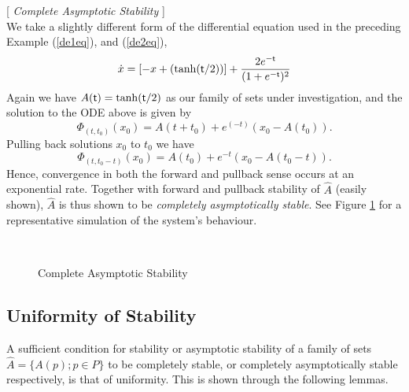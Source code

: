 \begin{eg} \label{caseg} [ {\em Complete Asymptotic Stability} ] \hfill \\
  We take a slightly different form of the differential equation
  used in the preceding Example (\ref{de1eq}), and (\ref{de2eq}),
  \begin{equation}
  \dot{x} = \left[ -x + \left( \tanh( \mathsf{\mathsf{t}}/2) \right) \right]
        + \frac{2e^{- \mathsf{\mathsf{t}}}} {(1 + e^{- \mathsf{\mathsf{t}}})^2}
  \end{equation}
  Again we have $A( \mathsf{\mathsf{t}}) = \tanh( \mathsf{\mathsf{t}}/2)$ as our family of sets under
  investigation, and the solution to the ODE above is given by
  \[ \Phi_{(t,t_0)}(x_0) = A(t + t_0) + e^{(-t)}(x_0 - A(t_0)). \]
  Pulling back solutions $x_0$ to $t_0$ we have
  \[ \Phi_{(t,t_0-t)}(x_0) = A(t_0) + e^{-t}(x_0 - A(t_0-t)). \]
  Hence, convergence in both the forward and pullback sense occurs
  at an exponential rate. Together with forward and
  pullback stability of $\hat{A}$ (easily shown), $\hat{A}$ is thus shown to
  be {\em completely asymptotically stable}. See Figure \ref{casegpic} for
  a representative simulation of the system's behaviour.
  \begin{figure}[htb]
  \begin{center}
  \leavevmode
  \hbox{
  \epsfxsize=9.5cm
    }%
  \protect\caption{Complete Asymptotic Stability}
        \protect\label{casegpic}
  \end{center}
  \end{figure}
\end{eg}

\subsection{Uniformity of Stability}
\label{unissec}

A sufficient condition for stability or asymptotic stability of a
family of sets $\hat{A} = \{A(p) ; p \in P \}$ to be completely
stable, or completely asymptotically stable respectively, is that
of uniformity. This is shown through the following lemmas.


